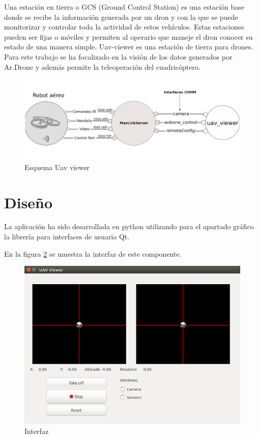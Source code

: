 \label{visor uavViewer}

Una estación en tierra o GCS (Ground Control Station) es una estación base donde se recibe la
información generada por un dron y con la que se puede monitorizar y controlar toda la actividad
de estos vehículos. Estas estaciones pueden ser fijas o móviles y permiten al operario que maneje el dron
conocer su estado de una manera simple. Uav-viewer es una estación de tierra para drones. Para este
trabajo se ha focalizado en la visión de los datos generados por Ar.Drone y además permite la teleoperación
del cuadricóptero. 

\begin{figure}[H]
  \centering
  \includegraphics[scale=0.2]{imagenes/Mapageneral.png}
  \caption{Esquema Uav viewer}
  \label{fig:esquemaUav}
\end{figure}

\section{Diseño}

La aplicación ha sido desarrollada en python utilizando para el apartado gráfico la librería
para interfaces de usuario Qt.

En la figura \ref{fig:interfazUavViewer} se muestra la interfaz de este componente.

\begin{figure}[H]
  \centering
  \includegraphics[scale=0.3]{imagenes/Uav_viewer_py.png}
  \caption{Interfaz}
  \label{fig:interfazUavViewer}
\end{figure}

